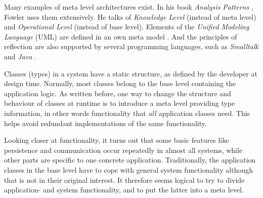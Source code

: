 Many examples of meta level architectures exist. In his book
\emph{Analysis Patterns} \cite{fowler1997}, Fowler uses them extensively.
He talks of \emph{Knowledge Level} (instead of meta level) and
\emph{Operational Level} (instead of base level). Elements of the
\emph{Unified Modeling Language} (UML) are defined in an own meta model
\cite{uml}. And the principles of reflection are also supported by several
programming languages, such as \emph{Smalltalk} \cite{smalltalk} and
\emph{Java} \cite{java}.

Classes (types) in a system have a static structure, as defined by the developer
at design time. Normally, most classes belong to the base level containing the
application logic. As written before, one way to change the structure and
behaviour of classes at runtime is to introduce a meta level providing type
information, in other words functionality that \emph{all} application classes
need. This helps avoid redundant implementations of the same functionality.

Looking closer at functionality, it turns out that some basic features like
persistence and communication occur repeatedly in almost all systems, while
other parts are specific to one concrete application. Traditionally, the
application classes in the base level have to cope with general system
functionality although that is not in their original interest. It therefore
seems logical to try to divide application- and system functionality, and to put
the latter into a meta level.
